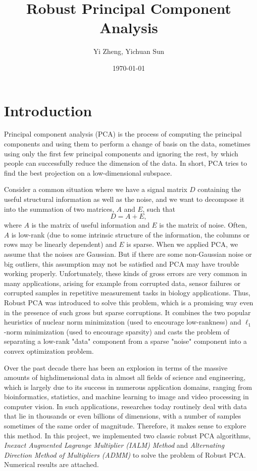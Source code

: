 \documentclass{article}
\begin{document}
\title{Robust Principal Component Analysis}
\date{\today}
\author{Yi Zheng, Yichuan Sun}
\maketitle
\tableofcontents     %
\newpage    
\section{Introduction}

Principal component analysis (PCA) is the process of computing the principal components and using them 
to perform a change of basis on the data, sometimes using only the first few principal components and ignoring the rest, 
by which people can successfully reduce the dimension of the data. In short, PCA tries to find the best projection on a low-dimensional subspace.

Consider a common situation where we have a signal matrix $D$ containing the useful structural information as well as the noise, 
and we want to decompose it into the summation of two matrices, $A$ and $E$, such that
$$
D = A + E,
$$
where $A$ is the matrix of useful information and $E$ is the matrix of noise. Often, $A$ is low-rank (due to some intrinsic structure 
of the information, the columns or rows may be linearly dependent) and $E$ is sparse. When we applied PCA, we assume that the noises are 
Gaussian. But if there are some non-Gaussian noise or big outliers, this assumption may not be satisfied and PCA may have trouble working properly. 
Unfortunately, these kinds of gross errors are very
common in many applications, arising for example from corrupted data, sensor failures or corrupted
samples in repetitive measurement tasks in biology applications. 
Thus, Robust PCA was introduced to solve this problem, which is a promising way even in the presence of such gross but sparse corruptions. It 
combines the two popular heuristics of nuclear norm minimization (used to encourage
low-rankness) and $\ell_1$-norm minimization (used to encourage sparsity) and casts the problem of separating
a low-rank "data" component from a sparse "noise" component into a convex optimization
problem.

Over the past decade there has been an explosion in terms of the massive amounts of highdimensional
data in almost all fields of science and engineering, which is largely due to its success
in numerous application domains, ranging from bioinformatics,
statistics, and machine learning to image and video processing
in computer vision.
In such applications, researches today routinely deal with data that lie in thousands or even billions
of dimensions, with a number of samples sometimes of the same order of magnitude. Therefore, it makes sense to explore 
this method. In this project, we implemented two classic robust PCA algorithms, \textit{Inexact Augmented Lagrange Multiplier (IALM) Method} and 
\textit{Alternating Direction Method of Multipliers (ADMM)} to solve the problem of Robust PCA. Numerical results are attached.
\end{document}
